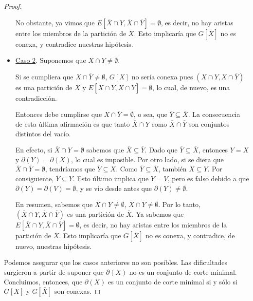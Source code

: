 \begin{proof}
\begin{itemize}
    No obstante, ya vimos que  $E[\overline{X} \cap Y, \overline{X} \cap \overline{Y}] = \emptyset$, es decir, no hay aristas entre los miembros de la partición de $\overline{X}$. Esto implicaría que $G[\bar{X}]$ no es conexa, y contradice nuestras hipótesis.
    
    \item \underline{Caso 2}. Suponemos que $X \cap Y \neq \emptyset$. 
    
    Si se cumpliera que $X \cap \overline{Y} \neq \emptyset$, $G[X]$ no sería conexa pues $(X \cap Y, X \cap \overline{Y})$ es una partición de $X$ y $E[X \cap Y, X \cap \overline{Y}] = \emptyset$, lo cual, de nuevo, es una contradicción. 
    
    Entonces debe cumplirse que $X \cap \overline{Y} = \emptyset$, o sea, que $\overline{Y} \subseteq \overline{X}$. La consecuencia de esta última afirmación es que tanto $\overline{X} \cap Y$ como $\overline{X} \cap \overline{Y}$ son conjuntos distintos del vacío. 

    En efecto, si $\overline{X} \cap Y = \emptyset$ sabemos que $\overline{X} \subseteq \overline{Y}$. Dado que $\overline{Y} \subseteq \overline{X}$, entonces $Y = X$ y $\partial(Y) = \partial(X)$, lo cual es imposible. Por otro lado, si se diera que $\overline{X} \cap \overline{Y} = \emptyset$, tendríamos que $\overline{Y} \subseteq X$. Como $\overline{Y} \subseteq \overline{X}$, también $X \subseteq Y$. Por consiguiente, $\overline{Y} \subseteq Y$. Esto último implica que $Y=V$, pero es falso debido a que $\partial(Y) = \partial(V) = \emptyset$, y se vio desde antes que $\partial(Y)\neq \emptyset$.

    En resumen, sabemos que $\overline{X} \cap Y \neq \emptyset$, $\overline{X} \cap \overline{Y} \neq \emptyset$. Por lo tanto, $(\overline{X} \cap Y, \overline{X} \cap \overline{Y})$ es una partición de $\overline{X}$. Ya sabemos que $E[\overline{X} \cap Y, \overline{X} \cap \overline{Y}] = \emptyset$, es decir, no hay aristas entre los miembros de la partición de $\overline{X}$. Esto implicaría que $G[\bar{X}]$ no es conexa, y contradice, de nuevo, nuestras hipótesis.
\end{itemize}


Podemos asegurar que los casos anteriores no son posibles. Las dificultades surgieron a partir de suponer que $\partial(X)$ no es un conjunto de corte minimal. Concluimos, entonces, que $\partial(X)$ es un conjunto de corte minimal si y sólo si $G[X]$ y $G[\bar{X}]$ son conexas. 

\end{proof}

